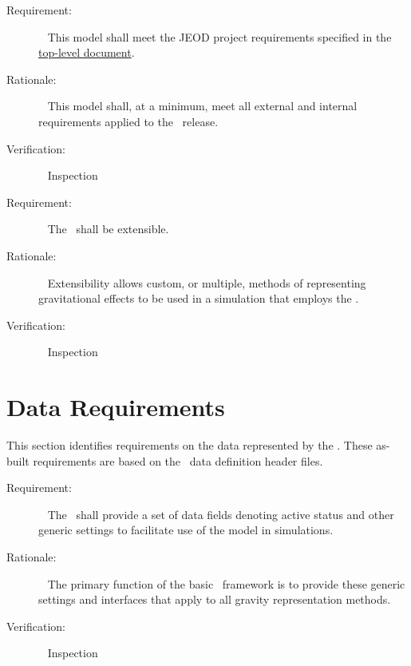 \label{reqt:toplevel}
\begin{description}
\item[Requirement:]\ \newline
  This model shall meet the JEOD project requirements specified in the 
  \JEODid\ \hyperref{file:\JEODHOME/docs/JEOD.pdf}{part1}{reqt}{ top-level
  document}.
\item[Rationale:]\ \newline
  This model shall, at a minimum, meet all external and internal requirements
  applied to the \JEODid\ release.
\item[Verification:]\ \newline
  Inspection
\end{description}

\label{reqt:extensible}
\begin{description}
\item[Requirement:]\ \newline
  The \ModelDesc\ shall be extensible.
\item[Rationale:]\ \newline
  Extensibility allows custom, or multiple, methods of representing
  gravitational effects to be used in a simulation that employs the \ModelDesc.
\item[Verification:]\ \newline
  Inspection
\end{description}

\section{Data Requirements}\label{sec:data_reqts}
This section identifies requirements on the data 
represented by the \ModelDesc. These as-built requirements are based on
the \ModelDesc\ data definition header files.

\label{reqt:generic_data}
\begin{description}
  \item[Requirement:]\ \newline
The \ModelDesc\ shall provide a set of data fields denoting active status
and other generic settings to facilitate use of the model in simulations.
  \item[Rationale:]\ \newline
The primary function of the basic \ModelDesc\ framework is to provide
these generic settings and interfaces that apply to all gravity representation
methods.
  \item[Verification:]\ \newline
Inspection
\end{description}

